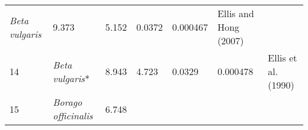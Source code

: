 \documentclass[]{article}
\begin{document}
\begin{longtable}[]{@{}lllllll@{}}
\begin{minipage}[t]{0.23\columnwidth}
\emph{Beta vulgaris}\strut
\end{minipage} & \begin{minipage}[t]{0.05\columnwidth}\raggedright
9.373\strut
\end{minipage} & \begin{minipage}[t]{0.08\columnwidth}\raggedright
5.152\strut
\end{minipage} & \begin{minipage}[t]{0.08\columnwidth}\raggedright
0.0372\strut
\end{minipage} & \begin{minipage}[t]{0.08\columnwidth}\raggedright
0.000467\strut
\end{minipage} & \begin{minipage}[t]{0.23\columnwidth}\raggedright
Ellis and Hong (2007)\strut
\end{minipage}\tabularnewline
\begin{minipage}[t]{0.05\columnwidth}\raggedright
14\strut
\end{minipage} & \begin{minipage}[t]{0.23\columnwidth}\raggedright
\emph{Beta vulgaris}*\strut
\end{minipage} & \begin{minipage}[t]{0.05\columnwidth}\raggedright
8.943\strut
\end{minipage} & \begin{minipage}[t]{0.08\columnwidth}\raggedright
4.723\strut
\end{minipage} & \begin{minipage}[t]{0.08\columnwidth}\raggedright
0.0329\strut
\end{minipage} & \begin{minipage}[t]{0.08\columnwidth}\raggedright
0.000478\strut
\end{minipage} & \begin{minipage}[t]{0.23\columnwidth}\raggedright
Ellis et al. (1990)\strut
\end{minipage}\tabularnewline
\begin{minipage}[t]{0.05\columnwidth}\raggedright
15\strut
\end{minipage} & \begin{minipage}[t]{0.23\columnwidth}\raggedright
\emph{Borago officinalis}\strut
\end{minipage} & \begin{minipage}[t]{0.05\columnwidth}\raggedright
6.748\strut
\end{minipage} & \begin{minipage}[t]{0.08\columnwidth}\raggedright

\end{minipage}
\end{longtable}
\end{document}
